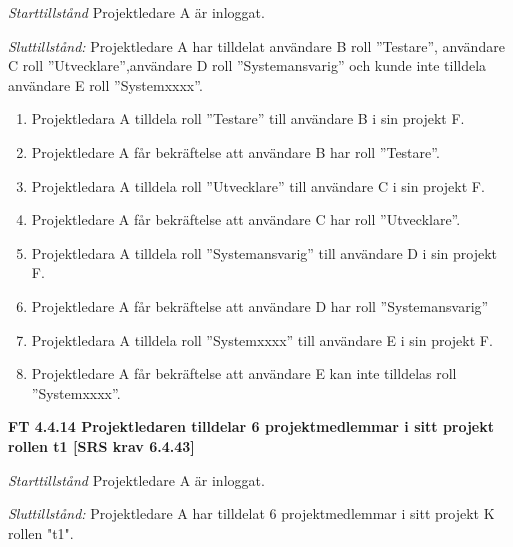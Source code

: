 \documentclass[a4paper]{article}
\begin{document}
\emph{Starttillstånd} Projektledare A är inloggat.

\emph{Sluttillstånd:} Projektledare A  har tilldelat användare B roll ”Testare”, användare C roll ”Utvecklare”,användare D roll ”Systemansvarig” och kunde inte tilldela användare E roll ”Systemxxxx”.

\begin{enumerate}
\item Projektledara A tilldela roll ”Testare” till användare B i sin projekt F.
\item Projektledare A får bekräftelse att användare B har roll ”Testare”.
\item Projektledara A tilldela roll ”Utvecklare” till användare C i sin projekt F.
\item Projektledare A får bekräftelse att användare C har roll ”Utvecklare”.
\item Projektledara A tilldela roll ”Systemansvarig” till användare D i sin projekt F.
\item Projektledare A får bekräftelse att användare D har roll ”Systemansvarig”
\item Projektledara A tilldela roll ”Systemxxxx” till användare E i sin projekt F.
\item Projektledare A får bekräftelse att användare E kan inte tilldelas roll ”Systemxxxx”.
\end{enumerate}

\textbf{FT 4.4.14 Projektledaren tilldelar 6 projektmedlemmar i sitt projekt rollen t1 [SRS krav 6.4.43]}

\emph{Starttillstånd} Projektledare A är inloggat.

\emph{Sluttillstånd:} Projektledare A  har tilldelat 6 projektmedlemmar i sitt projekt K  rollen "t1".
\end{document}
